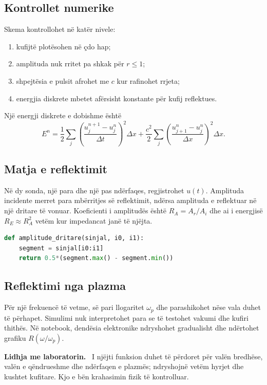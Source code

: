 \documentclass[11pt,oneside,openany]{book}
\newenvironment{lidhje}{\par\medskip\noindent\textbf{Lidhja me laboratorin.}\ }{\par\medskip}
\begin{document}
\subsection{Kontrollet numerike}
Skema kontrollohet në katër nivele:
\begin{enumerate}
\item kufijtë plotësohen në çdo hap;
\item amplituda nuk rritet pa shkak për $r\le1$;
\item shpejtësia e pulsit afrohet me $c$ kur rafinohet rrjeta;
\item energjia diskrete mbetet afërsisht konstante për kufij reflektues.
\end{enumerate}
Një energji diskrete e dobishme është
\begin{equation}
 E^n=\frac12\sum_j\left(\frac{u_j^{n+1}-u_j^n}{\Delta t}\right)^2\Delta x
 +\frac{c^2}{2}\sum_j\left(\frac{u_{j+1}^n-u_j^n}{\Delta x}\right)^2\Delta x.
\end{equation}

\subsection{Matja e reflektimit}
Në dy sonda, një para dhe një pas ndërfaqes, regjistrohet $u(t)$. Amplituda incidente merret para mbërritjes së reflektimit, ndërsa amplituda e reflektuar në një dritare të vonuar. Koeficienti i amplitudës është $R_A=A_r/A_i$ dhe ai i energjisë $R_E\approx R_A^2$ vetëm kur impedancat janë të njëjta.

\begin{lstlisting}[language=Python]
def amplitude_dritare(sinjal, i0, i1):
    segment = sinjal[i0:i1]
    return 0.5*(segment.max() - segment.min())
\end{lstlisting}

\subsection{Reflektimi nga plazma}
Për një frekuencë të vetme, së pari llogaritet $\omega_p$ dhe parashikohet nëse vala duhet të përhapet. Simulimi nuk interpretohet para se të testohet vakumi dhe kufiri thithës. Në notebook, dendësia elektronike ndryshohet gradualisht dhe ndërtohet grafiku $R(\omega/\omega_p)$.

\begin{lidhje}
I njëjti funksion duhet të përdoret për valën bredhëse, valën e qëndrueshme dhe ndërfaqen e plazmës; ndryshojnë vetëm hyrjet dhe kushtet kufitare. Kjo e bën krahasimin fizik të kontrolluar.
\end{lidhje}
\end{document}
